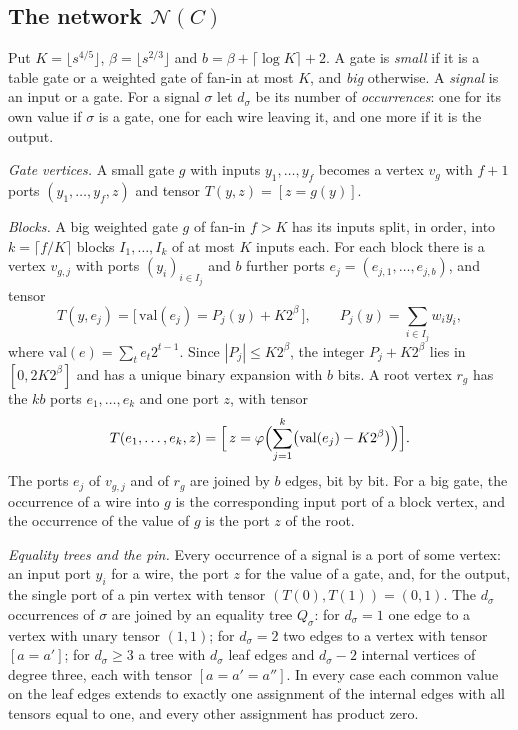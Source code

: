 \documentclass[11pt,reqno]{amsart}
\numberwithin{equation}{section}
\theoremstyle{plain}
\theoremstyle{definition}
\theoremstyle{remark}
\newcommand{\cN}{\mathcal{N}}
\begin{document}
\subsection{The network $\cN(C)$}
Put $K=\lfloor s^{4/5}\rfloor$, $\beta=\lfloor s^{2/3}\rfloor$ and
$b=\beta+\lceil\log K\rceil+2$. A gate is \emph{small} if it is a table gate or a
weighted gate of fan-in at most $K$, and \emph{big} otherwise. A \emph{signal}
is an input or a gate. For a signal $\sigma$ let $d_\sigma$ be its number of
\emph{occurrences}: one for its own value if $\sigma$ is a gate, one for each
wire leaving it, and one more if it is the output.

\smallskip\noindent\emph{Gate vertices.} A small gate $g$ with inputs
$y_1,\dots,y_f$ becomes a vertex $v_g$ with $f+1$ ports $(y_1,\dots,y_f,z)$ and
tensor $T(y,z)=[z=g(y)]$.

\smallskip\noindent\emph{Blocks.} A big weighted gate $g$ of fan-in $f>K$ has its
inputs split, in order, into $k=\lceil f/K\rceil$ blocks $I_1,\dots,I_k$ of at most
$K$ inputs each. For each block there is a vertex $v_{g,j}$ with ports
$(y_i)_{i\in I_j}$ and $b$ further ports $e_j=(e_{j,1},\dots,e_{j,b})$, and tensor
\[
T(y,e_j)=\bigl[\,\mathrm{val}(e_j)=P_j(y)+K2^\beta\,\bigr],\qquad
P_j(y)=\sum_{i\in I_j}w_iy_i,
\]
where $\mathrm{val}(e)=\sum_te_t2^{t-1}$. Since $|P_j|\le K2^\beta$, the integer
$P_j+K2^\beta$ lies in $[0,2K2^\beta]$ and has a unique binary expansion with
$b$ bits. A root vertex $r_g$ has the $kb$ ports $e_1,\dots,e_k$ and one port $z$,
with tensor
\[
T(e_1,\dots,e_k,z)=\Bigl[\,z=\varphi\Bigl(\sum_{j=1}^k\bigl(\mathrm{val}(e_j)-K2^\beta\bigr)\Bigr)\Bigr].
\]
The ports $e_j$ of $v_{g,j}$ and of $r_g$ are joined by $b$ edges, bit by bit.
For a big gate, the occurrence of a wire into $g$ is the corresponding input
port of a block vertex, and the occurrence of the value of $g$ is the port $z$
of the root.

\smallskip\noindent\emph{Equality trees and the pin.} Every occurrence of a
signal is a port of some vertex: an input port $y_i$ for a wire, the port $z$
for the value of a gate, and, for the output, the single port of a pin vertex
with tensor $(T(0),T(1))=(0,1)$. The $d_\sigma$ occurrences of $\sigma$ are
joined by an equality tree $Q_\sigma$: for $d_\sigma=1$ one edge to a vertex with
unary tensor $(1,1)$; for $d_\sigma=2$ two edges to a vertex with tensor $[a=a']$;
for $d_\sigma\ge3$ a tree with $d_\sigma$ leaf edges and $d_\sigma-2$ internal
vertices of degree three, each with tensor $[a=a'=a'']$. In every case each
common value on the leaf edges extends to exactly one assignment of the internal
edges with all tensors equal to one, and every other assignment has product
zero.
\end{document}
